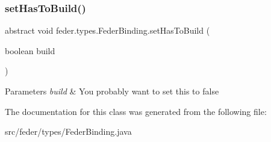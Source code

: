 \subsubsection{\texorpdfstring{set\+Has\+To\+Build()}{setHasToBuild()}}
{\footnotesize\ttfamily abstract void feder.\+types.\+Feder\+Binding.\+set\+Has\+To\+Build (\begin{DoxyParamCaption}\item[{boolean}]{build }\end{DoxyParamCaption})\hspace{0.3cm}{\ttfamily [abstract]}}


\begin{DoxyParams}{Parameters}
{\em build} & You probably want to set this to \textquotesingle{}false\textquotesingle{} \\
\hline
\end{DoxyParams}


The documentation for this class was generated from the following file\+:\begin{DoxyCompactItemize}
\item 
src/feder/types/Feder\+Binding.\+java\end{DoxyCompactItemize}
